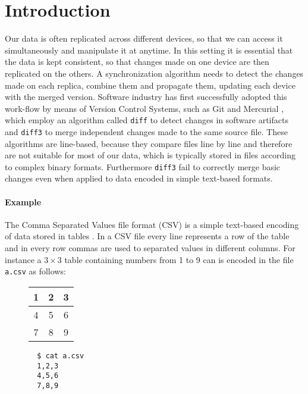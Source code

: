 \documentclass[preprint]{sigplanconf}
\begin{document}
\section{Introduction}
Our data is often replicated across different devices, so that we can access it simultaneously and
manipulate it at anytime. In this setting it is essential that the data is kept consistent, so that changes made on one device are then replicated on the others. A synchronization algorithm
needs to detect the changes made on each replica, combine them and propagate them, updating each device with the merged version. Software industry has first successfully adopted this work-flow by means of Version Control Systems, such as
Git \cite{Git} and Mercurial \cite{Mercurial}, which employ an algorithm called \texttt{diff} to detect changes
in software artifacts and \texttt{diff3} to merge independent changes made to the same source file.
These algorithms are line-based, because they compare files line by line and therefore are not suitable
for most of our data, which is typically stored in files according to complex binary formats. 
Furthermore \texttt{diff3} fail to correctly merge basic changes even when applied to data encoded in simple text-based formats.

\paragraph{Example}
The Comma Separated Values file format (CSV) is a simple text-based encoding of data stored in tables \cite{csv}.
In a CSV file every line represents a row of the table and in every row commas are used to separated values in different columns.
For instance a $3 \times 3$ table containing numbers from 1 to 9 can
is encoded in the file \texttt{a.csv} as follows:
\begin{figure}[!h]
\centering
\begin{minipage}{.25\textwidth}
  \centering
  \begin{tabular}{ | c | c | c | }
    \hline
    1 & 2 & 3 \\ \hline
    4 & 5 & 6 \\ \hline
    7 & 8 & 9  \\ \hline
  \end{tabular}
\end{minipage}%
\begin{minipage}{.25\textwidth}
  \centering
  \begin{verbatim}
  $ cat a.csv
  1,2,3
  4,5,6
  7,8,9
  \end{verbatim}
\end{minipage}%
\end{figure}
\end{document}
